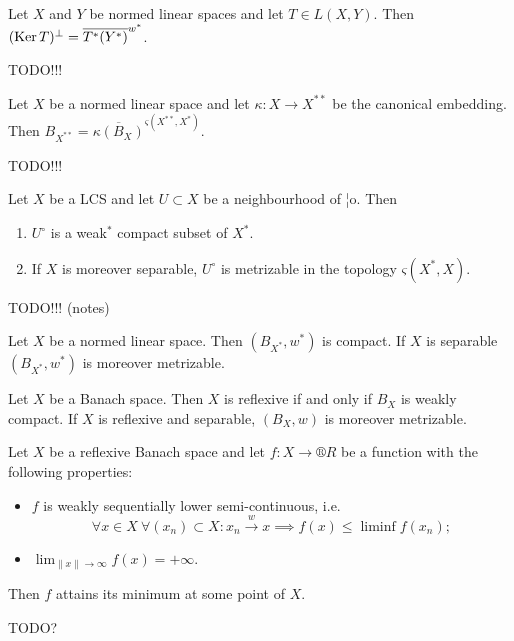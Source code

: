 \documentclass[12pt]{article}					%
\begin{document}
\begin{dusledek}
	Let $X$ and $Y$ be normed linear spaces and let $T \in L(X, Y)$. Then $(\operatorname{Ker} T)^\perp = \overline{T^*(Y^*)}^{w^*}$.

	\begin{dukazin}
		TODO!!!
	\end{dukazin}
\end{dusledek}

\begin{veta}[Goldstine]
	Let $X$ be a normed linear space and let $κ: X \rightarrow X^{**}$ be the canonical embedding. Then $B_{X^{**}} = \overline{κ(B_X)}^{ς(X^{**}, X^*)}$.

	\begin{dukazin}
		TODO!!!
	\end{dukazin}
\end{veta}

\begin{veta}
	Let $X$ be a LCS and let $U \subset X$ be a neighbourhood of ¦o. Then
	\begin{enumerate}
		\item $U^∘$ is a weak$^*$ compact subset of $X^*$.
		\item If $X$ is moreover separable, $U^∘$ is metrizable in the topology $ς(X^*, X)$.
	\end{enumerate}

	\begin{dukazin}
		TODO!!! (notes)
	\end{dukazin}
\end{veta}

\begin{dusledek}
	Let $X$ be a normed linear space. Then $(B_{X^*}, w^*)$ is compact. If $X$ is separable $(B_{X^*}, w^*)$ is moreover metrizable.
\end{dusledek}

\begin{dusledek}
	Let $X$ be a Banach space. Then $X$ is reflexive if and only if $B_X$ is weakly compact. If $X$ is reflexive and separable, $(B_X, w)$ is moreover metrizable.
\end{dusledek}

\begin{dusledek}
	Let $X$ be a reflexive Banach space and let $f: X \rightarrow ®R$ be a function with the following properties:
	\begin{itemize}
		\item $f$ is weakly sequentially lower semi-continuous, i.e.
			$$ \forall x \in X\ \forall (x_n) \subset X: x_n \overset{w}\rightarrow x \implies f(x) ≤ \liminf f(x_n); $$
		\item $\lim_{\|x\| \rightarrow ∞} f(x) = +∞$.
	\end{itemize}
	Then $f$ attains its minimum at some point of $X$.

	\begin{dukazin}
		TODO?
	\end{dukazin}
\end{dusledek}
\end{document}
